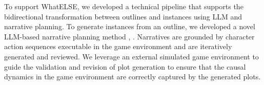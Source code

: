 {To support {\sc WhatELSE}, we developed a technical pipeline that supports the bidirectional transformation between outlines and instances using LLM and narrative planning. To generate instances from an outline, we developed a novel LLM-based narrative planning method , . Narratives are grounded by character action sequences executable in the game environment and are iteratively generated and reviewed. We leverage an external simulated game environment to guide the validation and revision of plot generation to ensure that the causal dynamics in the game environment are correctly captured by the generated plots. 



}
